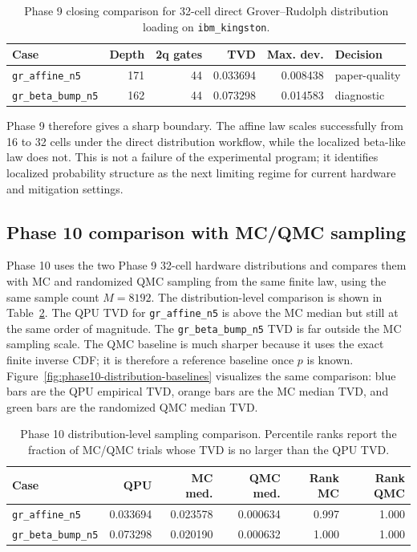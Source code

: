 \begin{table}[h]
\centering
\small
\begin{tabular}{lrrrrl}
\toprule
Case & Depth & 2q gates & TVD & Max. dev. & Decision \\
\midrule
\texttt{gr\_affine\_n5} & 171 & 44 & 0.033694 & 0.008438
& paper-quality \\
\texttt{gr\_beta\_bump\_n5} & 162 & 44 & 0.073298 & 0.014583
& diagnostic \\
\bottomrule
\end{tabular}
\caption{Phase 9 closing comparison for 32-cell direct Grover--Rudolph
distribution loading on \texttt{ibm\_kingston}.}
\label{tab:phase9-closing-comparison}
\end{table}

Phase 9 therefore gives a sharp boundary. The affine law scales successfully
from 16 to 32 cells under the direct distribution workflow, while the localized
beta-like law does not. This is not a failure of the experimental program; it
identifies localized probability structure as the next limiting regime for
current hardware and mitigation settings.

\subsection{Phase 10 comparison with MC/QMC sampling}

Phase 10 uses the two Phase 9 32-cell hardware distributions and compares them
with MC and randomized QMC sampling from the same finite law, using the same
sample count \(M=8192\). The distribution-level comparison is shown in
Table~\ref{tab:phase10-distribution-baselines}. The QPU TVD for
\texttt{gr\_affine\_n5} is above the MC median but still at the same order of
magnitude. The \texttt{gr\_beta\_bump\_n5} TVD is far outside the MC sampling
scale. The QMC baseline is much sharper because it uses the exact finite inverse
CDF; it is therefore a reference baseline once \(p\) is known.
Figure~\ref{fig:phase10-distribution-baselines} visualizes the same comparison:
blue bars are the QPU empirical TVD, orange bars are the MC median TVD, and
green bars are the randomized QMC median TVD.

\begin{table}[h]
\centering
\small
\begin{tabular}{lrrrrr}
\toprule
Case & QPU & MC med. & QMC med. & Rank MC & Rank QMC \\
\midrule
\texttt{gr\_affine\_n5} & 0.033694 & 0.023578 & 0.000634 & 0.997 & 1.000 \\
\texttt{gr\_beta\_bump\_n5} & 0.073298 & 0.020190 & 0.000632 & 1.000 & 1.000 \\
\bottomrule
\end{tabular}
\caption{Phase 10 distribution-level sampling comparison. Percentile ranks
report the fraction of MC/QMC trials whose TVD is no larger than the QPU TVD.}
\label{tab:phase10-distribution-baselines}
\end{table}

